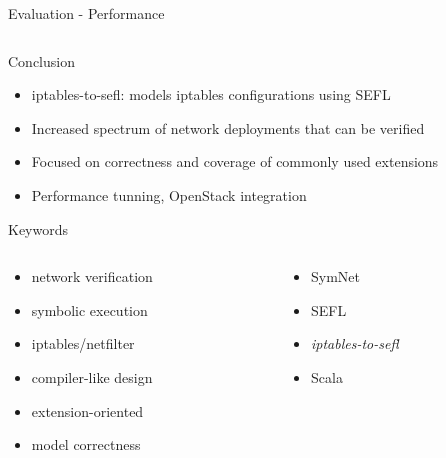 \documentclass{beamer}
\begin{document}
\begin{frame}{Evaluation - Performance}
\begin{columns}
\begin{column}{.5\textwidth}
    \end{column}
  \end{columns}
\end{frame}

\begin{frame}{Conclusion}
  \begin{itemize}
    \item iptables-to-sefl: models iptables configurations using SEFL
    \pause
    \item Increased spectrum of network deployments that can be verified
    \pause
    \item Focused on correctness and coverage of commonly used extensions
    \pause
    \item Performance tunning, OpenStack integration
  \end{itemize}
\end{frame}

\begin{frame}{Keywords}
\begin{columns}
  \begin{column}{0.5\textwidth}
    \centering
    \begin{itemize}
      \item network verification
      \item symbolic execution
      \item iptables/netfilter
      \item compiler-like design
      \item extension-oriented
      \item model correctness
    \end{itemize}
  \end{column}
  \begin{column}{0.5\textwidth}
    \centering
    \begin{itemize}
      \item SymNet
      \item SEFL
      \item \emph{iptables-to-sefl}
      \item Scala
    \end{itemize}
  \end{column}
\end{columns}
\end{frame}
\end{document}

